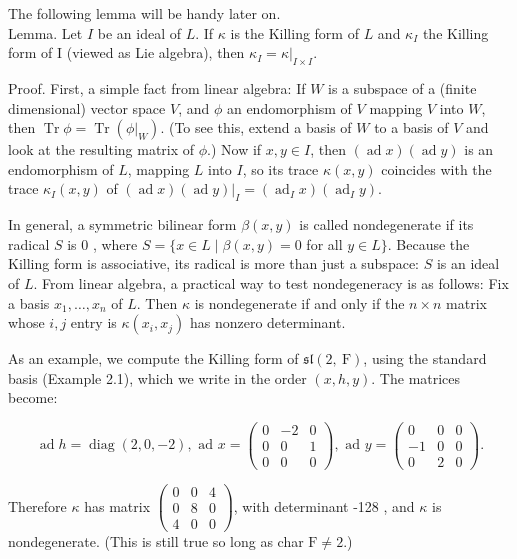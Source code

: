 \documentclass[10pt]{article}
\begin{document}
The following lemma will be handy later on.\\
Lemma. Let $I$ be an ideal of $L$. If $\kappa$ is the Killing form of $L$ and $\kappa_{I}$ the Killing form of I (viewed as Lie algebra), then $\kappa_{I}=\left.\kappa\right|_{I \times I}$.

Proof. First, a simple fact from linear algebra: If $W$ is a subspace of a (finite dimensional) vector space $V$, and $\phi$ an endomorphism of $V$ mapping $V$ into $W$, then $\operatorname{Tr} \phi=\operatorname{Tr}\left(\left.\phi\right|_{W}\right)$. (To see this, extend a basis of $W$ to a basis of $V$ and look at the resulting matrix of $\phi$.) Now if $x, y \in I$, then $(\operatorname{ad} x)(\operatorname{ad} y)$ is an endomorphism of $L$, mapping $L$ into $I$, so its trace $\kappa(x, y)$ coincides with the trace $\kappa_{I}(x, y)$ of $\left.(\operatorname{ad} x)(\operatorname{ad} y)\right|_{I}=\left(\operatorname{ad}_{I} x\right)\left(\operatorname{ad}_{I} y\right)$.

In general, a symmetric bilinear form $\beta(x, y)$ is called nondegenerate if its radical $S$ is 0 , where $S=\{x \in L \mid \beta(x, y)=0$ for all $y \in L\}$. Because the Killing form is associative, its radical is more than just a subspace: $S$ is an ideal of $L$. From linear algebra, a practical way to test nondegeneracy is as follows: Fix a basis $x_{1}, \ldots, x_{n}$ of $L$. Then $\kappa$ is nondegenerate if and only if the $n \times n$ matrix whose $i, j$ entry is $\kappa\left(x_{i}, x_{j}\right)$ has nonzero determinant.

As an example, we compute the Killing form of $\mathfrak{s l}(2, \mathrm{~F})$, using the standard basis (Example 2.1), which we write in the order $(x, h, y)$. The matrices become:

$$
\operatorname{ad} h=\operatorname{diag}(2,0,-2), \text { ad } x=\left(\begin{array}{rrr}
0 & -2 & 0 \\
0 & 0 & 1 \\
0 & 0 & 0
\end{array}\right), \text { ad } y=\left(\begin{array}{rrr}
0 & 0 & 0 \\
-1 & 0 & 0 \\
0 & 2 & 0
\end{array}\right) .
$$

Therefore $\kappa$ has matrix $\left(\begin{array}{lll}0 & 0 & 4 \\ 0 & 8 & 0 \\ 4 & 0 & 0\end{array}\right)$, with determinant -128 , and $\kappa$ is nondegenerate. (This is still true so long as char $\mathrm{F} \neq 2$.)
\end{document}
